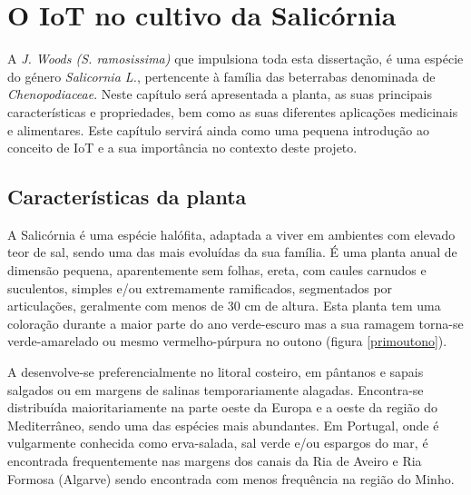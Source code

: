 
\chapter{O \acl{IoT} no cultivo da Salicórnia}

 A \sr \space \textit{J. Woods (S. ramosissima)}\cite{JoaoSilva} que impulsiona toda esta dissertação, é uma espécie do género \textit{Salicornia L.}, pertencente à família das beterrabas denominada de \textit{Chenopodiaceae}\cite{chenopodiaceae}.  Neste capítulo será apresentada a planta, as suas principais características e propriedades, bem como as suas diferentes aplicações medicinais e alimentares. Este capítulo servirá ainda como uma pequena introdução ao conceito de \ac{IoT} e a sua  importância no contexto deste projeto.


\section{Características da planta}


A Salicórnia é uma espécie halófita, adaptada a viver em ambientes com elevado teor de sal\cite{ferri}, sendo uma das mais evoluídas da sua família. É uma planta anual de dimensão pequena, aparentemente sem folhas, ereta, com caules carnudos e suculentos, simples e/ou extremamente ramificados, segmentados por articulações\cite{Silva2000}, geralmente com menos de 30 cm de altura\cite{overviewsal}. Esta planta tem uma coloração durante a maior parte do ano verde-escuro mas a sua ramagem torna-se  verde-amarelado ou mesmo vermelho-púrpura no outono\cite{Silva2000} (figura \ref{primoutono}).





A \sr \space desenvolve-se preferencialmente no litoral costeiro, em pântanos e sapais salgados ou em margens de salinas temporariamente alagadas. Encontra-se distribuída maioritariamente na parte oeste da Europa e a oeste da região do Mediterrâneo, sendo uma das espécies mais abundantes\cite{Figueroa1987}. Em Portugal, onde é vulgarmente conhecida como erva-salada, sal verde e/ou espargos do mar\cite{RaquelPinto}, é encontrada frequentemente nas margens dos canais da Ria de Aveiro e Ria Formosa (Algarve)\cite{RaquelPinto} sendo encontrada com menos frequência na região do Minho\cite{Silva2000}. 

\newpage

